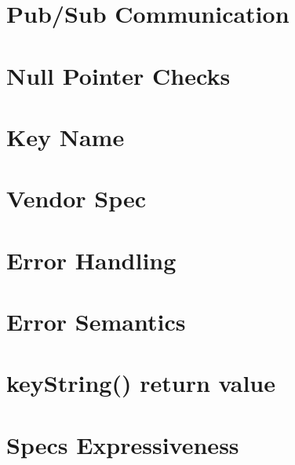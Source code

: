 \let\mypdfximage\pdfximage\def\pdfximage{\immediate\mypdfximage}\documentclass[twoside]{book}
\newcommand{\+}{\discretionary{\mbox{\scriptsize$\hookleftarrow$}}{}{}}
\begin{document}
\chapter{Pub/\+Sub Communication}
\label{doc_decisions_0b_rejected_elektra_web_pubsub_md}

\chapter{Null Pointer Checks}
\label{doc_decisions_0b_rejected_null_pointer_checks_md}

\chapter{Key Name}
\label{doc_decisions_0b_rejected_separate_key_name_md}

\chapter{Vendor Spec}
\label{doc_decisions_0b_rejected_vendor_spec_md}

\chapter{Error Handling}
\label{doc_decisions_1_problem_clear_error_handling_md}

\chapter{Error Semantics}
\label{doc_decisions_1_problem_clear_error_semantics_md}

\chapter{key\+String() return value}
\label{doc_decisions_1_problem_clear_key_string_return_value_md}

\chapter{Spec\textquotesingle{}s Expressiveness}
\label{doc_decisions_1_problem_clear_spec_expressiveness_md}

\end{document}
